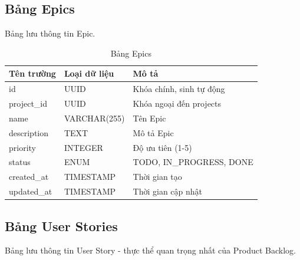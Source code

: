 \documentclass[12pt,a4paper]{report}
\begin{document}
\subsection{Bảng Epics}

Bảng lưu thông tin Epic.

\begin{table}[H]
\centering
\caption{Bảng Epics}
\begin{tabular}{|p{4cm}|p{4cm}|p{7cm}|}
\hline
\textbf{Tên trường} & \textbf{Loại dữ liệu} & \textbf{Mô tả} \\
\hline
id & UUID & Khóa chính, sinh tự động \\
\hline
project\_id & UUID & Khóa ngoại đến projects \\
\hline
name & VARCHAR(255) & Tên Epic \\
\hline
description & TEXT & Mô tả Epic \\
\hline
priority & INTEGER & Độ ưu tiên (1-5) \\
\hline
status & ENUM & TODO, IN\_PROGRESS, DONE \\
\hline
created\_at & TIMESTAMP & Thời gian tạo \\
\hline
updated\_at & TIMESTAMP & Thời gian cập nhật \\
\hline
\end{tabular}
\label{tab:epics_table}
\end{table}


\subsection{Bảng User Stories}

Bảng lưu thông tin User Story - thực thể quan trọng nhất của Product Backlog.
\end{document}

